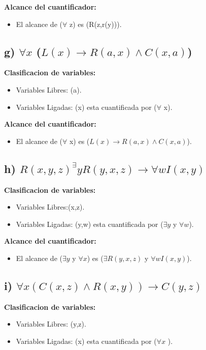 \documentclass[11pt,letterpaper]{article}
\begin{document}
\textbf{Alcance del cuantificador:}
\begin{itemize}
    \item El alcance de ($\forall$ z) es (R(z,r(y))).
\end{itemize}
  

\subsection*{g) $\forall x$ ($L(x) \rightarrow R(a,x) \wedge  C(x,a)$)}

\textbf{Clasificacion de variables:}
\begin{itemize}
    \item Variables Libres: (a).
    \item Variables Ligadas: (x) esta cuantificada por ($\forall$ x).
\end{itemize}

\textbf{Alcance del cuantificador:}
\begin{itemize}
    \item El alcance de ($\forall$ x) es ($L(x) \rightarrow R(a,x) \wedge C(x,a)$).
\end {itemize}

\subsection*{h) $R(x,y,z) ^ \exists y R(y,x,z) \rightarrow \forall w I(x,y)$}

\textbf{Clasificacion de variables:}
\begin{itemize}
    \item Variables Libres:(x,z).
    \item Variables Ligadas: (y,w) esta cuantificada por ($\exists y$ y $\forall w$).
\end{itemize}

\textbf{Alcance del cuantificador:}
\begin{itemize}
    \item El alcance de ($\exists y$ y $\forall x$) es ($\exists R(y,x,z)$ y $\forall w I(x,y)$).
\end{itemize}

\subsection*{i) $\forall x(C(x,z) \wedge  R(x,y)) \rightarrow C(y,z)$}

\textbf{Clasificacion de variables:}
\begin{itemize}
    \item Variables Libres: (y,z).
    \item Variables Ligadas: (x) esta cuantificada por ($\forall x$ ).
\end{itemize}
\end{document}
